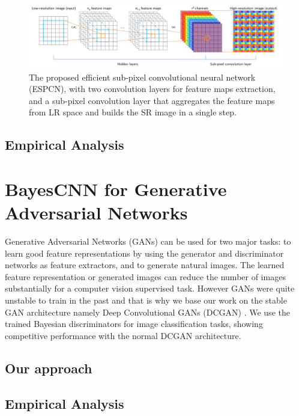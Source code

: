 \begin{figure}[htbp]
\begin{center}
\includegraphics[width=1.0\linewidth]{Chapter6/Figs/networkstructure.jpg}
\caption{The proposed efficient sub-pixel convolutional neural network (ESPCN), with two convolution layers for feature maps extraction, and a sub-pixel convolution layer that aggregates the feature maps from \ac{LR} space and builds the \ac{SR} image in a single step.}
\label{fig:networkstructure}
\end{center}
\end{figure}

\subsection{Empirical Analysis}



\section{BayesCNN for Generative Adversarial Networks}

Generative Adversarial Networks (GANs) \cite{goodfellow2014generative} can be used for two major tasks: to learn good feature representations by using the generator and discriminator networks as feature extractors, and to generate natural images. The learned feature representation or generated images can reduce the number of images substantially for a computer vision supervised task. However GANs were quite unstable to train in the past and that is why we base our work on the stable GAN architecture namely Deep Convolutional GANs (DCGAN) \cite{DBLP:journals/corr/RadfordMC15}. We use the trained Bayesian discriminators for image classification tasks, showing competitive performance with the normal DCGAN architecture.

\subsection{Our approach}
\subsection{Empirical Analysis}



